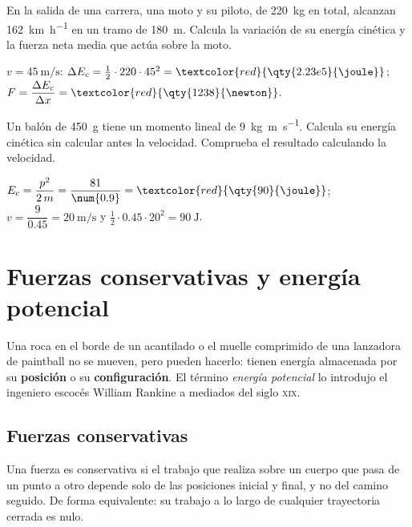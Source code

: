\begin{exercise}
    En la salida de una carrera, una moto y su piloto, de \qty{220}{\kg} en total, alcanzan \qty{162}{\km\per\hour} en un tramo de
    \qty{180}{\m}. Calcula la variación de su energía cinética y la fuerza neta media que actúa sobre la moto.
    \begin{solu}
        \(v = \qty{45}{\m\per\s}\): \(\Delta E_c = \frac{1}{2} \cdot 220 \cdot 45^2 = \textcolor{red}{\qty{2.23e5}{\joule}}\);
        \(F = \dfrac{\Delta E_c}{\Delta x} = \textcolor{red}{\qty{1238}{\newton}}\).
    \end{solu}
\end{exercise}

\begin{exercise}
    Un balón de \qty{450}{\g} tiene un momento lineal de \qty{9}{\kg\m\per\s}. Calcula su energía cinética sin calcular antes la
    velocidad. Comprueba el resultado calculando la velocidad.
    \begin{solu}
        \(E_c = \dfrac{p^2}{2\,m} = \dfrac{81}{\num{0.9}} = \textcolor{red}{\qty{90}{\joule}}\); \(v = \dfrac{9}{\num{0.45}} = \qty{20}{\m\per\s}\)
        y \(\frac{1}{2} \cdot \num{0.45} \cdot 20^2 = \qty{90}{\joule}\).
    \end{solu}
\end{exercise}

\section{Fuerzas conservativas y energía potencial}\label{sec:ud12-potencial}

Una roca en el borde de un acantilado o el muelle comprimido de una lanzadora de paintball no se mueven, pero pueden hacerlo: tienen
energía almacenada por su \textbf{posición} o su \textbf{configuración}. El término \textit{energía potencial} lo introdujo el ingeniero
escocés William Rankine a mediados del siglo \textsc{xix}.

\subsection{Fuerzas conservativas}

\begin{definition}
    Una fuerza es conservativa si el trabajo que realiza sobre un cuerpo que pasa de un punto a otro depende solo de las posiciones
    inicial y final, y no del camino seguido. De forma equivalente: su trabajo a lo largo de cualquier trayectoria cerrada es nulo.
\end{definition}


